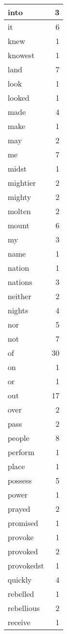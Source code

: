 \begin{center}
\begin{longtable}{l|r}
into & 3 \\ \hline
it & 6 \\ \hline
knew & 1 \\ \hline
knowest & 1 \\ \hline
land & 7 \\ \hline
look & 1 \\ \hline
looked & 1 \\ \hline
made & 4 \\ \hline
make & 1 \\ \hline
may & 2 \\ \hline
me & 7 \\ \hline
midst & 1 \\ \hline
mightier & 2 \\ \hline
mighty & 2 \\ \hline
molten & 2 \\ \hline
mount & 6 \\ \hline
my & 3 \\ \hline
name & 1 \\ \hline
nation & 1 \\ \hline
nations & 3 \\ \hline
neither & 2 \\ \hline
nights & 4 \\ \hline
nor & 5 \\ \hline
not & 7 \\ \hline
of & 30 \\ \hline
on & 1 \\ \hline
or & 1 \\ \hline
out & 17 \\ \hline
over & 2 \\ \hline
pass & 2 \\ \hline
people & 8 \\ \hline
perform & 1 \\ \hline
place & 1 \\ \hline
possess & 5 \\ \hline
power & 1 \\ \hline
prayed & 2 \\ \hline
promised & 1 \\ \hline
provoke & 1 \\ \hline
provoked & 2 \\ \hline
provokedst & 1 \\ \hline
quickly & 4 \\ \hline
rebelled & 1 \\ \hline
rebellious & 2 \\ \hline
receive & 1 \\ \hline

\end{longtable}
\end{center}
